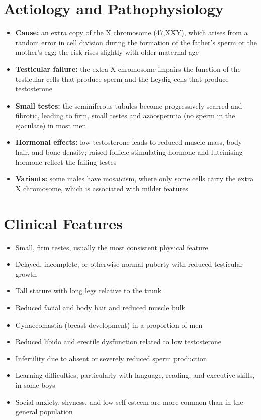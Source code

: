 \section*{Aetiology and Pathophysiology}
\begin{itemize}
    \item \textbf{Cause:} an extra copy of the X chromosome (47,XXY), which arises from a random error in cell division during the formation of the father's sperm or the mother's egg; the risk rises slightly with older maternal age
    \item \textbf{Testicular failure:} the extra X chromosome impairs the function of the testicular cells that produce sperm and the Leydig cells that produce testosterone
    \item \textbf{Small testes:} the seminiferous tubules become progressively scarred and fibrotic, leading to firm, small testes and azoospermia (no sperm in the ejaculate) in most men
    \item \textbf{Hormonal effects:} low testosterone leads to reduced muscle mass, body hair, and bone density; raised follicle-stimulating hormone and luteinising hormone reflect the failing testes
    \item \textbf{Variants:} some males have mosaicism, where only some cells carry the extra X chromosome, which is associated with milder features
\end{itemize}

\section*{Clinical Features}
\begin{itemize}
    \item Small, firm testes, usually the most consistent physical feature
    \item Delayed, incomplete, or otherwise normal puberty with reduced testicular growth
    \item Tall stature with long legs relative to the trunk
    \item Reduced facial and body hair and reduced muscle bulk
    \item Gynaecomastia (breast development) in a proportion of men
    \item Reduced libido and erectile dysfunction related to low testosterone
    \item Infertility due to absent or severely reduced sperm production
    \item Learning difficulties, particularly with language, reading, and executive skills, in some boys
    \item Social anxiety, shyness, and low self-esteem are more common than in the general population
\end{itemize}

